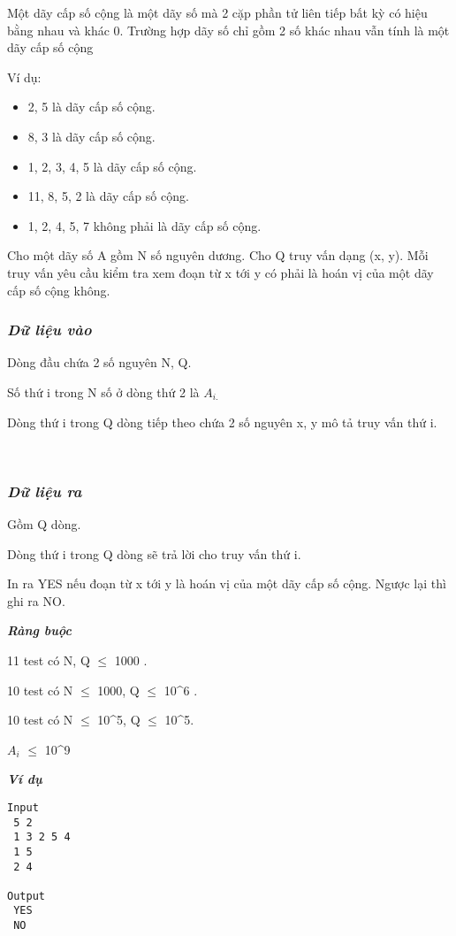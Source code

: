 

Một dãy cấp số cộng là một dãy số mà 2 cặp phần tử liên tiếp bất kỳ có hiệu bằng nhau và khác 0. Trường hợp dãy số chỉ gồm 2 số khác nhau vẫn tính là một dãy cấp số cộng

Ví dụ:
\begin{itemize}
	\item 2, 5 là dãy cấp số cộng.
	\item 8, 3 là dãy cấp số cộng.
	\item 1, 2, 3, 4, 5 là dãy cấp số cộng.
	\item 11, 8, 5, 2 là dãy cấp số cộng.
	\item 1, 2, 4, 5, 7 không phải là dãy cấp số cộng.
\end{itemize}

Cho một dãy số A gồm N số nguyên dương. Cho Q truy vấn dạng (x, y). Mỗi truy vấn yêu cầu kiểm tra xem đoạn từ x tới y có phải là hoán vị của một dãy cấp số cộng không.

\subsubsection{\emph{Dữ liệu vào }}

Dòng đầu chứa 2 số nguyên N, Q.

Số thứ i trong N số ở dòng thứ 2 là $A_{i.}$

Dòng thứ i trong Q dòng tiếp theo chứa 2 số nguyên x, y mô tả truy vấn thứ i.

 

\subsubsection{\emph{Dữ liệu ra }}

Gồm Q dòng.

Dòng thứ i trong Q dòng sẽ trả lời cho truy vấn thứ i.

In ra YES nếu đoạn từ x tới y là hoán vị của một dãy cấp số cộng. Ngược lại thì ghi ra NO.

\emph{\textbf{Ràng buộc }}

11 test có N, Q  $\le$  1000 .

10 test có N  $\le$  1000, Q  $\le$  10^6 .

10 test có N  $\le$  10^5, Q  $\le$  10^5.

$A_{i}$  $\le$  10^9

\emph{\textbf{Ví dụ }}
\begin{verbatim}
Input
 5 2
 1 3 2 5 4
 1 5
 2 4

Output
 YES
 NO


\end{verbatim}

 
